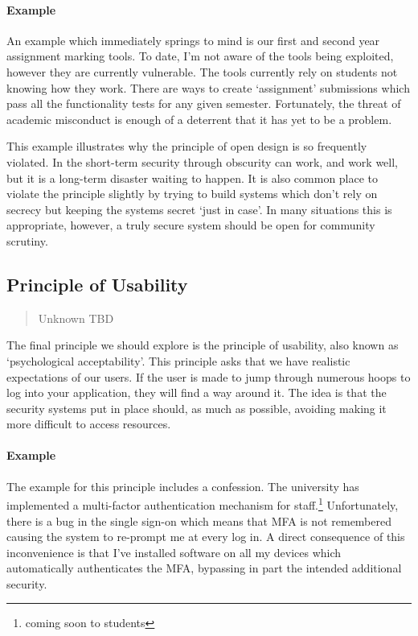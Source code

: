 \paragraph{Example}
An example which immediately springs to mind is our first and second year assignment marking tools.
To date, I'm not aware of the tools being exploited, however they are currently vulnerable.
The tools currently rely on students not knowing how they work.
There are ways to create `assignment' submissions which pass all the functionality tests for any given semester.
Fortunately, the threat of academic misconduct is enough of a deterrent that it has yet to be a problem.

This example illustrates why the principle of open design is so frequently violated.
In the short-term security through obscurity can work, and work well, but it is a long-term disaster waiting to happen.
It is also common place to violate the principle slightly by trying to build systems which don't rely on secrecy but keeping the systems secret `just in case'.
In many situations this is appropriate, however, a truly secure system should be open for community scrutiny.

\subsection{Principle of Usability}

\begin{quote}{Unknown}
TBD
\end{quote}

The final principle we should explore is the principle of usability, also known as `psychological acceptability'.
This principle asks that we have realistic expectations of our users.
If the user is made to jump through numerous hoops to log into your application, they will find a way around it.
The idea is that the security systems put in place should, as much as possible, avoiding making it more difficult to access resources.

\paragraph{Example}
The example for this principle includes a confession.
The university has implemented a multi-factor authentication mechanism for staff.\footnote{coming soon to students}
Unfortunately, there is a bug in the single sign-on which means that MFA is not remembered causing the system to re-prompt me at every log in.
A direct consequence of this inconvenience is that I've installed software on all my devices which automatically authenticates the MFA,
bypassing in part the intended additional security.

